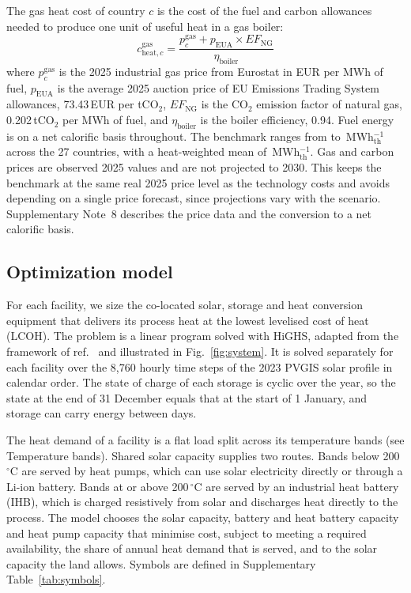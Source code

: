 \documentclass[11pt]{article}
\begin{document}
The gas heat cost of country $c$ is the cost of the fuel and carbon allowances needed to produce one unit of useful heat in a gas boiler:
\begin{equation}
c^{\mathrm{gas}}_{\mathrm{heat},c} = \frac{p^{\mathrm{gas}}_{c} + p_{\mathrm{EUA}} \times EF_{\mathrm{NG}}}{\eta_{\mathrm{boiler}}}
\label{eq:gas}
\end{equation}
where $p^{\mathrm{gas}}_{c}$ is the 2025 industrial gas price from Eurostat in EUR per MWh of fuel\cite{eurostat_gasprices}, $p_{\mathrm{EUA}}$ is the average 2025 auction price of EU Emissions Trading System allowances, 73.43\,EUR per tCO$_2$\cite{icap_euets}, $EF_{\mathrm{NG}}$ is the CO$_2$ emission factor of natural gas, 0.202\,tCO$_2$ per MWh of fuel\cite{ipcc2006stationary}, and $\eta_{\mathrm{boiler}}$ is the boiler efficiency, 0.94\cite{saad2026}. Fuel energy is on a net calorific basis throughout. The benchmark ranges from  to \,MWh$_{\mathrm{th}}^{-1}$ across the 27 countries, with a heat-weighted mean of \,MWh$_{\mathrm{th}}^{-1}$. Gas and carbon prices are observed 2025 values and are not projected to 2030. This keeps the benchmark at the same real 2025 price level as the technology costs and avoids depending on a single price forecast, since projections vary with the scenario. Supplementary Note~8 describes the price data and the conversion to a net calorific basis.

\subsection*{Optimization model}

For each facility, we size the co-located solar, storage and heat conversion equipment that delivers its process heat at the lowest levelised cost of heat (LCOH). The problem is a linear program solved with HiGHS, adapted from the framework of ref.~ and illustrated in Fig.~\ref{fig:system}. It is solved separately for each facility over the 8,760 hourly time steps of the 2023 PVGIS solar profile in calendar order. The state of charge of each storage is cyclic over the year, so the state at the end of 31 December equals that at the start of 1 January, and storage can carry energy between days.

The heat demand of a facility is a flat load split across its temperature bands (see Temperature bands). Shared solar capacity supplies two routes. Bands below 200\,$^\circ$C are served by heat pumps, which can use solar electricity directly or through a Li-ion battery. Bands at or above 200\,$^\circ$C are served by an industrial heat battery (IHB), which is charged resistively from solar and discharges heat directly to the process. The model chooses the solar capacity, battery and heat battery capacity and heat pump capacity that minimise cost, subject to meeting a required availability, the share of annual heat demand that is served, and to the solar capacity the land allows. Symbols are defined in Supplementary Table~\ref{tab:symbols}.
\end{document}
